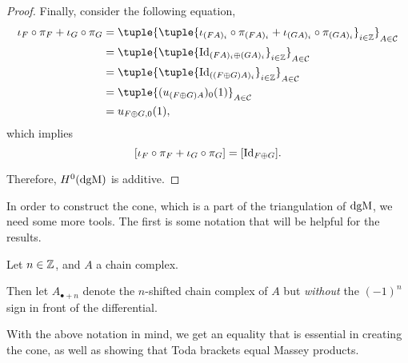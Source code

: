 \begin{proof}
    Finally, consider the following equation,
    \begin{align*}
        \iota_F \circ \pi_F + \iota_G \circ \pi_G &= \tuple{ \tuple{\iota_{(F A)_i} \circ \pi_{(F A)_i} + \iota_{(G A)_i} \circ \pi_{(G A)_i} }_{i \in \Zb} }_{A \in \Cc} \\
        &= \tuple{ \tuple{ \Id_{(F A)_i \oplus (G A)_i} }_{i \in \Zb} }_{A \in \Cc} \\
        &= \tuple{ \tuple{ \Id_{((F \oplus G) A)_i} }_{i \in \Zb} }_{A \in \Cc} \\
        &= \tuple{ (u_{(F \oplus G) A})_0 (1)}_{A \in \Cc} \\
        &= u_{F \oplus G, 0} (1),
    \end{align*}
    which implies
    \[
        [\iota_F \circ \pi_F + \iota_G \circ \pi_G] = [\operatorname{Id}_{F \oplus G}].
    \]

    Therefore, \( H^0(\operatorname{dgM}) \) is additive.
\end{proof}

In order to construct the cone, which is a part of the triangulation of \( \operatorname{dgM} \), we need some more tools. The first is some notation that will be helpful for the results.

\begin{notation}
    Let \( n \in {\mathbb{Z}} \), and \( A \) a chain complex.
    
    Then let \( A_{\bullet+n} \) denote the \( n \)-shifted chain complex of \( A \) but \emph{without} the \( (-1)^n \) sign in front of the differential.
\end{notation}

With the above notation in mind, we get an equality that is essential in creating the cone, as well as showing that Toda brackets equal Massey products.

